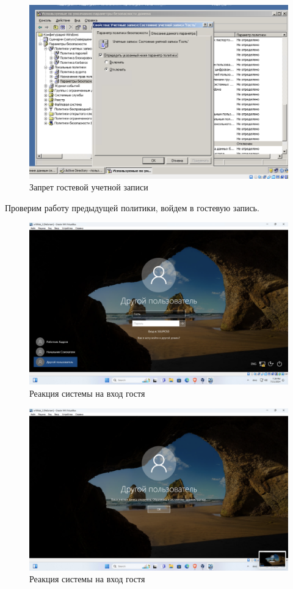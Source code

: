 \begin{figure}[H]
  \centering
  \includegraphics[width=1\textwidth]{pict/prac/60}
  \caption{Запрет гостевой учетной записи}
\end{figure}

Проверим работу предыдущей политики, войдем в гостевую запись.
\begin{figure}[H]
  \centering
  \includegraphics[width=1\textwidth]{pict/prac/65}
  \caption{Реакция системы на вход гостя}
\end{figure}

\begin{figure}[H]
  \centering
  \includegraphics[width=1\textwidth]{pict/prac/66}
  \caption{Реакция системы на вход гостя}
\end{figure}

